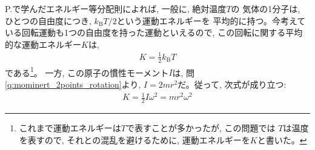 P.\pageref{def:temperature0}で学んだエネルギー等分配則によれば, 
一般に, 絶対温度$T$の
気体の1分子は, ひとつの自由度につき, $k_{\text{B}}T/2$という運動エネルギーを
平均的に持つ。今考えている回転運動も1つの自由度を持った運動といえるので, 
この回転に関する平均的な運動エネルギー$K$は, 
\begin{eqnarray}
K=\frac{1}{2}k_{\text{B}}T\label{eq:2atommolrot1}
\end{eqnarray}
である\footnote{これまで運動エネルギーは$T$で表すことが多かったが, この問題では
$T$は温度を表すので, それとの混乱を避けるために, 運動エネルギーを$K$と書いた。}。
一方, この原子の慣性モーメント$I$は, 問\ref{q:mominert_2points_rotation}より, 
$I=2mr^2$だ。従って, 次式が成り立つ:
\begin{eqnarray}
K=\frac{1}{2}I\omega^2=mr^2\omega^2\label{eq:2atommolrot2}
\end{eqnarray}

